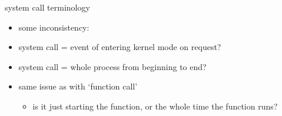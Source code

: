 \begin{frame}{system call terminology}
    \begin{itemize}
    \item some inconsistency:
    \vspace{.5cm}
    \item system call = event of entering kernel mode on request?
    \item system call = whole process from beginning to end?
    \vspace{.5cm}
    \item same issue as with `function call'
	\begin{itemize}
	\item is it just starting the function, or the whole time the function runs?
	\end{itemize}
    \end{itemize}
\end{frame}
